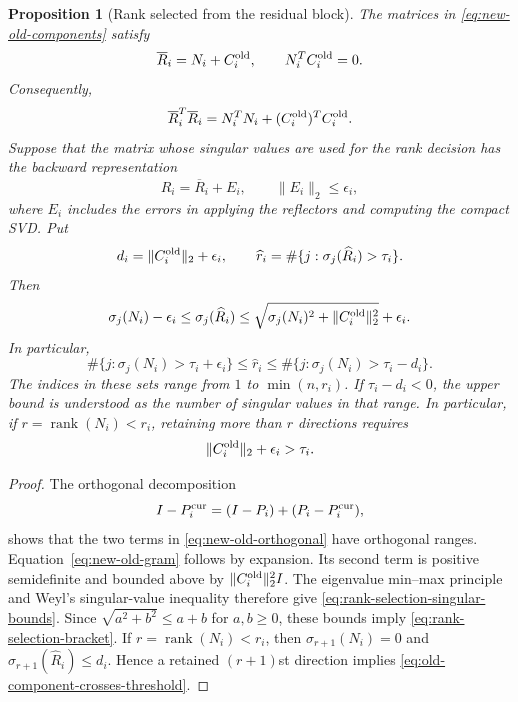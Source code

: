 \documentclass[11pt]{article}
\newtheorem{proposition}{Proposition}
\theoremstyle{definition}
\begin{document}
\begin{proposition}[Rank selected from the residual block]
\label{prop:rank-selection}
The matrices in \eqref{eq:new-old-components} satisfy
\begin{equation}
 \overline R_i=N_i+C_i^{\rm old},
 \qquad N_i^TC_i^{\rm old}=0.
 \label{eq:new-old-orthogonal}
\end{equation}
Consequently,
\begin{equation}
 \overline R_i^T\overline R_i
 =N_i^TN_i+(C_i^{\rm old})^TC_i^{\rm old}.
 \label{eq:new-old-gram}
\end{equation}
Suppose that the matrix whose singular values are used for the rank decision
has the backward representation
\[
 \widehat R_i=\overline R_i+E_i,
 \qquad \|E_i\|_2\le\epsilon_i,
\]
where $E_i$ includes the errors in applying the reflectors and computing the
compact SVD.  Put
\[
 d_i=\|C_i^{\rm old}\|_2+\epsilon_i,
 \qquad
 \widehat r_i=
 \#\{j:\sigma_j(\widehat R_i)>\tau_i\}.
\]
Then
\begin{equation}
 \sigma_j(N_i)-\epsilon_i
 \le\sigma_j(\widehat R_i)
 \le\sqrt{\sigma_j(N_i)^2+\|C_i^{\rm old}\|_2^2}+\epsilon_i.
 \label{eq:rank-selection-singular-bounds}
\end{equation}
In particular,
\begin{equation}
 \#\{j:\sigma_j(N_i)>\tau_i+\epsilon_i\}
 \le \widehat r_i
 \le
 \#\{j:\sigma_j(N_i)>\tau_i-d_i\}.
 \label{eq:rank-selection-bracket}
\end{equation}
The indices in these sets range from $1$ to $\min(n,r_i)$.  If
$\tau_i-d_i<0$, the upper bound is understood as the number of singular
values in that range.  In particular, if
$r=\operatorname{rank}(N_i)<r_i$, retaining more than $r$ directions
requires
\begin{equation}
 \|C_i^{\rm old}\|_2+\epsilon_i>\tau_i.
 \label{eq:old-component-crosses-threshold}
\end{equation}
\end{proposition}

\begin{proof}
The orthogonal decomposition
\[
 I-P_i^{\rm cur}=(I-P_i)+(P_i-P_i^{\rm cur}),
\]
shows that the two terms in \eqref{eq:new-old-orthogonal} have orthogonal ranges.
Equation~\eqref{eq:new-old-gram} follows by expansion.  Its second term is
positive semidefinite and bounded above by $\|C_i^{\rm old}\|_2^2I$.
The eigenvalue min--max principle and Weyl's singular-value inequality
therefore give \eqref{eq:rank-selection-singular-bounds}.  Since
$\sqrt{a^2+b^2}\le a+b$ for $a,b\ge0$, these bounds imply
\eqref{eq:rank-selection-bracket}.  If
$r=\operatorname{rank}(N_i)<r_i$, then
$\sigma_{r+1}(N_i)=0$ and
$\sigma_{r+1}(\widehat R_i)\le d_i$.  Hence a retained $(r+1)$st direction
implies \eqref{eq:old-component-crosses-threshold}.
\end{proof}
\end{document}
